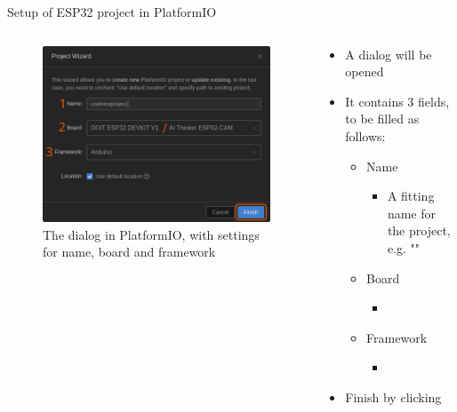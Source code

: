 \documentclass[aspectratio=169]{beamer}
\begin{document}
\begin{frame}{Setup of ESP32 project in PlatformIO}
\begin{columns}
	\begin{column}{0.5\textwidth}
		\begin{figure}
  			\includegraphics[height=0.7\textheight,keepaspectratio=true]{assets/pictures/pio-project-2.png}
  			\caption{The  dialog in PlatformIO, with settings for name, board and framework}
  			\label{fig:pio-project2}
		\end{figure}
	\end{column}
	\begin{column}{0.5\textwidth}
		\begin{textBox}
			\begin{itemize}
				\item A   dialog will be opened
				\item It contains 3 fields, to be filled as follows:
				\begin{itemize}
					\item Name
					\begin{itemize}
						\item A fitting name for the project, e.g. ""
					\end{itemize}
					\item Board
					\begin{itemize}
						\item {}
					\end{itemize}
					\item Framework
					\begin{itemize}
						\item {}
					\end{itemize}
				\end{itemize}
				\item Finish by clicking 
			\end{itemize}
		\end{textBox}
	\end{column}
\end{columns}
\end{frame}
\end{document}

